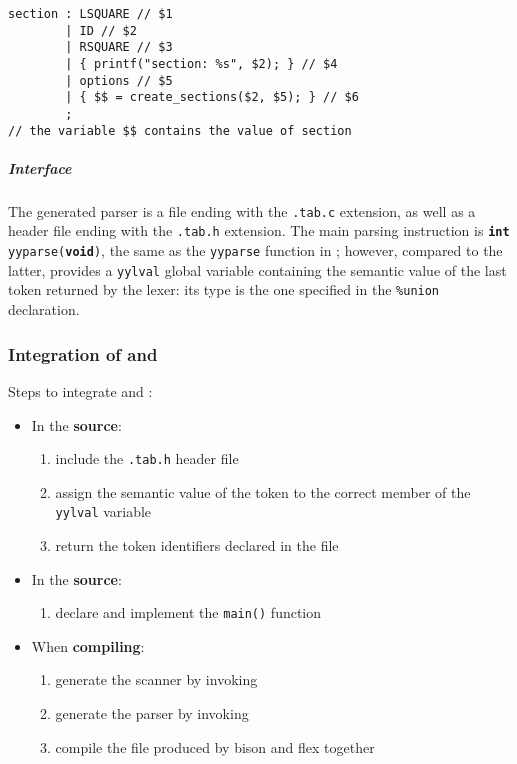 \documentclass[english]{article}
\begin{document}
\begin{onepage}
  \begin{lstlisting}[language=LANCE, caption={Semantic value usage}, label={lst:bison-semantic-value-usage}]
section : LSQUARE // $1
        | ID // $2
        | RSQUARE // $3
        | { printf("section: %s", $2); } // $4
        | options // $5
        | { $$ = create_sections($2, $5); } // $6
        ;
// the variable $$ contains the value of section
\end{lstlisting}
\end{onepage}

\subparagraph*{Interface}

The generated parser is a \clang file ending with the \texttt{.tab.c} extension, as well as a header file ending with the \texttt{.tab.h} extension.
The main parsing instruction is \texttt{\textbf{int} yyparse(\textbf{void})}, the same as the \texttt{yyparse} function in \flex;
however, compared to the latter, \bison provides a \texttt{yylval} global variable containing the semantic value of the last token returned by the lexer:
its type is the one specified in the \texttt{\%union} declaration.

\subsubsection{Integration of \flex and \bison}

Steps to integrate \flex and \bison:

\begin{itemize}
  \item In the \textbf{\flex source}:
        \begin{enumerate}[series=flex-bison-enum, label=step \arabic*., ref=(step \arabic*), leftmargin=*, labelindent=2em, widest*=6]
          \item include the \texttt{.tab.h} header file
          \item assign the semantic value of the token to the correct member of the \texttt{yylval} variable
          \item return the token identifiers declared in the \bison file
        \end{enumerate}
  \item In the \textbf{\bison source}:
        \begin{enumerate}[resume*=flex-bison-enum]
          \item declare and implement the \texttt{main()} function
        \end{enumerate}
  \item When \textbf{compiling}:
        \begin{enumerate}[resume*=flex-bison-enum]
          \item\label{enum:flex-bison-command-1} generate the \flex scanner by invoking \flex
          \item\label{enum:flex-bison-command-2} generate the \bison parser by invoking \bison
          \item\label{enum:flex-bison-command-3} compile the \clang file produced by bison and flex together
        \end{enumerate}
\end{itemize}
\end{document}
